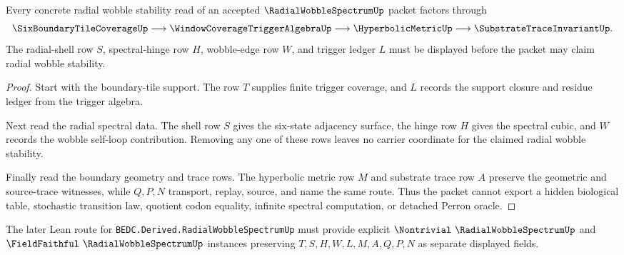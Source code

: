 \begin{theorem}
\label{thm:radial-wobble-spectrum-trigger-nonescape}
Every concrete radial wobble stability read of an accepted $\RadialWobbleSpectrumUp$ packet factors through
$$
\SixBoundaryTileCoverageUp \longrightarrow \WindowCoverageTriggerAlgebraUp \longrightarrow \HyperbolicMetricUp \longrightarrow \SubstrateTraceInvariantUp .
$$
The radial-shell row $S$, spectral-hinge row $H$, wobble-edge row $W$, and trigger ledger $L$ must be displayed before the packet may claim radial wobble stability.
\end{theorem}
\begin{proof}
Start with the boundary-tile support. The row $T$ supplies finite trigger coverage, and $L$ records the support closure and residue ledger from the trigger algebra.

Next read the radial spectral data. The shell row $S$ gives the six-state adjacency surface, the hinge row $H$ gives the spectral cubic, and $W$ records the wobble self-loop contribution. Removing any one of these rows leaves no carrier coordinate for the claimed radial wobble stability.

Finally read the boundary geometry and trace rows. The hyperbolic metric row $M$ and substrate trace row $A$ preserve the geometric and source-trace witnesses, while $Q,P,N$ transport, replay, source, and name the same route. Thus the packet cannot export a hidden biological table, stochastic transition law, quotient codon equality, infinite spectral computation, or detached Perron oracle.
\end{proof}



The later Lean route for \texttt{BEDC.Derived.RadialWobbleSpectrumUp} must provide explicit $\Nontrivial\ \RadialWobbleSpectrumUp$ and $\FieldFaithful\ \RadialWobbleSpectrumUp$ instances preserving $T,S,H,W,L,M,A,Q,P,N$ as separate displayed fields.


